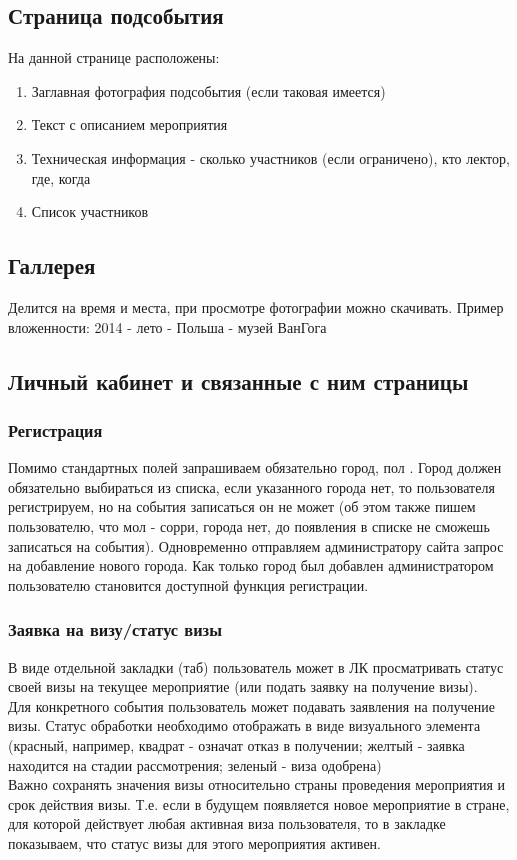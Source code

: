 \documentclass[DIV=calc, paper=a4, fontsize=11pt]{scrartcl} %
\begin{document}
\subsection{Страница подсобытия}
На данной странице расположены:
    \begin{enumerate}
        \item Заглавная фотография подсобытия (если таковая имеется)
        \item Текст с описанием мероприятия
        \item Техническая информация - сколько участников (если ограничено), кто лектор, где, когда
        \item Список участников
    \end{enumerate}


\subsection{Галлерея}
Делится на время и места, при просмотре фотографии можно скачивать. Пример вложенности:
2014 - лето - Польша - музей ВанГога

\subsection{Личный кабинет и связанные с ним страницы}
\subsubsection{Регистрация}
Помимо стандартных полей запрашиваем обязательно город, пол . 
Город должен обязательно выбираться из списка, если указанного города нет, то пользователя регистрируем, но на события записаться он не может (об этом также пишем пользователю, что мол - сорри, города нет, до появления в списке не сможешь записаться на события). Одновременно отправляем администратору сайта запрос на добавление нового города. Как только город был добавлен администратором пользователю становится доступной функция регистрации.

\subsubsection{Заявка на визу/статус визы}
В виде отдельной закладки (таб) пользователь может в ЛК просматривать статус своей визы на текущее мероприятие (или подать заявку на получение визы).
\\[0.5cm]
Для конкретного события пользователь может подавать заявления на получение визы. Статус обработки необходимо отображать в виде визуального элемента (красный, например, квадрат - означат отказ в получении; желтый - заявка находится на стадии рассмотрения; зеленый - виза одобрена)
\\[0.5cm]
Важно сохранять значения визы относительно страны проведения мероприятия и срок действия визы. Т.е. если в будущем появляется новое мероприятие в стране, для которой действует любая активная виза пользователя, то в закладке показываем, что статус визы для этого мероприятия активен.
\end{document}
